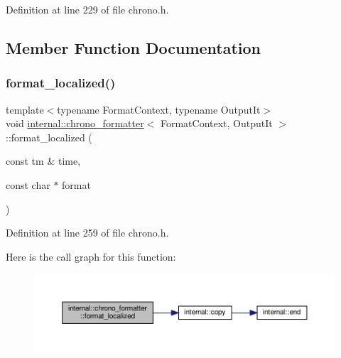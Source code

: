 Definition at line 229 of file chrono.\+h.



\subsection{Member Function Documentation}
\mbox{\label{structinternal_1_1chrono__formatter_a1466a3d30fb07c336e5ba5239482d8ec}} 
\subsubsection{\texorpdfstring{format\+\_\+localized()}{format\_localized()}}
{\footnotesize\ttfamily template$<$typename Format\+Context, typename Output\+It$>$ \\
void \hyperlink{structinternal_1_1chrono__formatter}{internal\+::chrono\+\_\+formatter}$<$ Format\+Context, Output\+It $>$\+::format\+\_\+localized (\begin{DoxyParamCaption}\item[{const tm \&}]{time,  }\item[{const char $\ast$}]{format }\end{DoxyParamCaption})\hspace{0.3cm}{\ttfamily [inline]}}



Definition at line 259 of file chrono.\+h.

Here is the call graph for this function\+:
\nopagebreak
\begin{figure}[H]
\begin{center}
\leavevmode
\includegraphics[width=350pt]{structinternal_1_1chrono__formatter_a1466a3d30fb07c336e5ba5239482d8ec_cgraph}
\end{center}
\end{figure}
\mbox{\label{structinternal_1_1chrono__formatter_a91d13ec0f969481e287c6e813b28bd6d}} 
